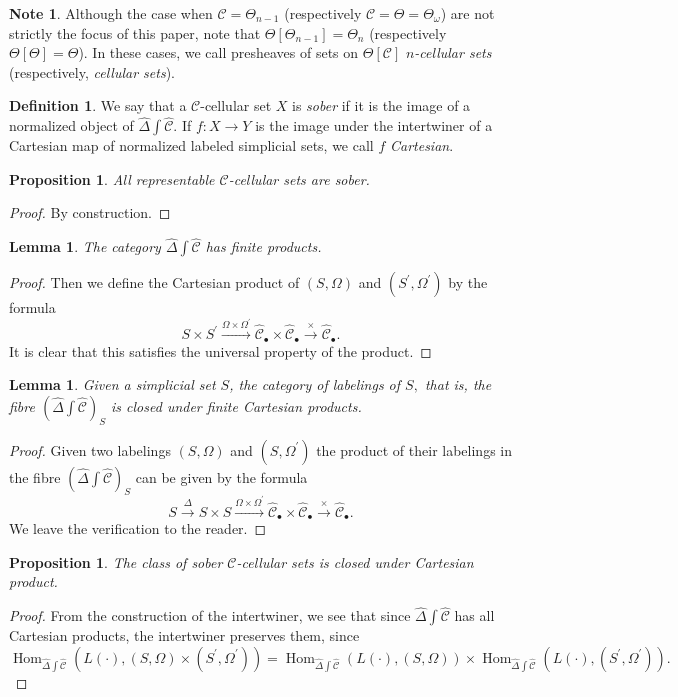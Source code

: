 \documentclass[a4paper]{article}
\numberwithin{equation}{subsection}
\theoremstyle{plain}   %
\newtheorem{prop}[equation]{Proposition}
\newtheorem{lemma}[equation]{Lemma}
\theoremstyle{definition}
\newtheorem{defn}[equation]{Definition}
\newtheorem{note}[equation]{Note}
\theoremstyle{remark}
\theoremstyle{plain}
\DeclareMathOperator{\Hom}{Hom}
\newcommand{\psh}[1]{\ensuremath{\widehat{#1}}}
\providecommand{\C}{}
\renewcommand{\C}{\ensuremath{\mathcal{C}}}
\newcommand{\ssetlab}{\ensuremath{\widehat{\Delta} \int \widehat{\mathcal{C}}}}
\begin{document}
\begin{note} Although the case when \(\C=\Theta_{n-1}\) (respectively \(\C=\Theta=\Theta_\omega\)) are not strictly the focus of this paper, note that \(\Theta[\Theta_{n-1}]=\Theta_n\) (respectively \(\Theta[\Theta]=\Theta\)).  In these cases, we call presheaves of sets on \(\Theta[\C]\) \emph{\(n\)-cellular sets} (respectively, \emph{cellular sets}).  
\end{note}

\begin{defn} We say that a \(\C\)-cellular set \(X\) is \emph{sober} if it is the image of a normalized object of \(\ssetlab\). If \(f:X\to Y\) is the image under the intertwiner of a Cartesian map of normalized labeled simplicial sets, we call \(f\) \emph{Cartesian}.
\end{defn}

\begin{prop} All representable \(\C\)-cellular sets are sober.
\end{prop}
\begin{proof} By construction.
\end{proof}

\begin{lemma}
	The category \(\ssetlab\) has finite products.
\end{lemma}
\begin{proof}
	Then we define the Cartesian product of \((S,\Omega)\) and \((S^\prime,\Omega^\prime)\) by the formula 
	\[
		S\times S^\prime \xrightarrow{\Omega \times \Omega^\prime} \psh{\C}_\bullet \times \psh{\C}_\bullet \xrightarrow{\times} \psh{\C}_\bullet.
	\]  It is clear that this satisfies the universal property of the product.
\end{proof}
\begin{lemma} Given a simplicial set \(S\), the category of labelings of \(S,\) that is, the fibre \(\left(\ssetlab\right)_S\) is closed under finite Cartesian products. 
\end{lemma}
\begin{proof} Given two labelings \((S,\Omega)\) and  \((S,\Omega^\prime)\) the product of their labelings in the fibre \(\left(\ssetlab\right)_S\) can be given by the formula 
	\[S\xrightarrow{\Delta} S\times S \xrightarrow{\Omega\times \Omega^\prime}  \psh{\C}_\bullet \times \psh{\C}_\bullet \xrightarrow{\times} \psh{\C}_\bullet.\]  We leave the verification to the reader.
\end{proof}

\begin{prop} The class of sober \(\C\)-cellular sets is closed under Cartesian product.
\end{prop}
\begin{proof} From the construction of the intertwiner, we see that since \(\ssetlab\) has all Cartesian products, the intertwiner preserves them, since
	\[
		\Hom_{\ssetlab}(L(\cdot), (S,\Omega)\times (S^\prime,\Omega^\prime))=\Hom_{\ssetlab}(L(\cdot), (S,\Omega))\times \Hom_{\ssetlab}(L(\cdot), (S^\prime,\Omega^\prime)).
	\] 
\end{proof}
\end{document}
